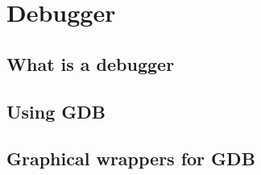 
\section{Debugger}
\label{debugger}

\subsection{What is a debugger}

\subsection{Using GDB}

\subsection{Graphical wrappers for GDB}
